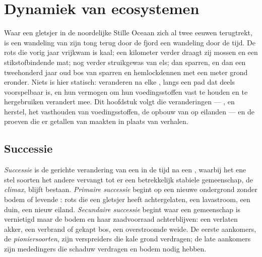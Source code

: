 \chapter{Dynamiek van ecosystemen}\label{ch:b1:ecosystem-dynamics}

Waar een gletsjer in de noordelijke Stille Oceaan zich al twee eeuwen
terugtrekt, is een wandeling van zijn tong terug door de fjord een
wandeling door de tijd. De rots die vorig jaar vrijkwam is kaal; een
kilometer verder draagt zij mossen en een stikstofbindende mat; nog verder
struikgewas van els; dan sparren, en dan een tweehonderd jaar oud bos van
sparren en hemlockdennen met een meter grond eronder. Niets is hier statisch:
 veranderen na elke , langs een pad dat deels
voorspelbaar is, en hun vermogen om hun voedingsstoffen vast te houden en
te hergebruiken verandert mee. Dit hoofdstuk volgt die veranderingen ---
,  en herstel, het vasthouden van voedingsstoffen, de
opbouw van  op eilanden --- en de proeven die er getallen
van maakten in plaats van verhalen.

\section{Successie}

\begin{definition}\label{def:b1:ecosystem-dynamics:succession}
\emph{Successie} is de gerichte verandering van een  in de
tijd na een , waarbij het ene stel soorten het andere vervangt tot
er een betrekkelijk stabiele gemeenschap, de \emph{climax}, blijft bestaan.
\emph{Primaire successie} begint op een nieuwe ondergrond zonder bodem of
levende : rots die een gletsjer heeft achtergelaten, een
lavastroom, een duin, een nieuw eiland. \emph{Secundaire successie} begint
waar een gemeenschap is vernietigd maar de bodem en haar zaadvoorraad
achterblijven: een verlaten akker, een verbrand of gekapt bos, een
overstroomde weide. De eerste aankomers, de \emph{pioniersoorten}, zijn
verspreiders die kale grond verdragen; de late aankomers zijn mededingers
die schaduw verdragen en bodem nodig hebben.
\end{definition}

